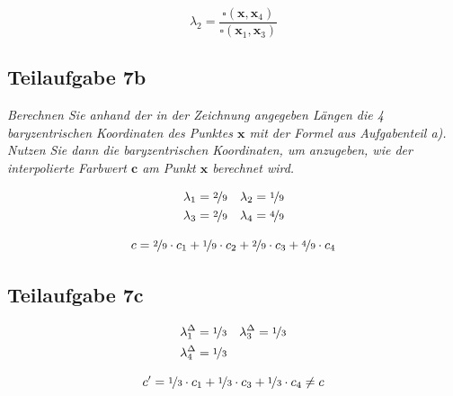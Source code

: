\documentclass[a4paper]{scrartcl}
\begin{document}
\[\lambda_2 = \frac{\square(\mathbf{x}, \mathbf{x}_4)}{\square(\mathbf{x}_1, \mathbf{x}_3)}\]

\subsection*{Teilaufgabe 7b}
\textit{Berechnen Sie anhand der in der Zeichnung angegeben Längen die 4 baryzentrischen
Koordinaten des Punktes $\mathbf{x}$ mit der Formel aus Aufgabenteil a). Nutzen Sie dann
die baryzentrischen Koordinaten, um anzugeben, wie der interpolierte Farbwert $\mathbf{c}$ am
Punkt $\mathbf{x}$ berechnet wird.}

\begin{align}
    \lambda_1 &= \nicefrac{2}{9}  & \lambda_2 &= \nicefrac{1}{9}\\
    \lambda_3 &= \nicefrac{2}{9}  & \lambda_4 &= \nicefrac{4}{9}
\end{align}

\[c = \nicefrac{2}{9} \cdot c_1 + \nicefrac{1}{9} \cdot c_2 + \nicefrac{2}{9} \cdot c_3 + \nicefrac{4}{9} \cdot c_4\]

\subsection*{Teilaufgabe 7c}
\begin{align}
    \lambda_1^\Delta &= \nicefrac{1}{3}  & \lambda_3^\Delta &= \nicefrac{1}{3}\\
    \lambda_4^\Delta &= \nicefrac{1}{3}
\end{align}

\[c' = \nicefrac{1}{3} \cdot c_1 + \nicefrac{1}{3} \cdot c_3 + \nicefrac{1}{3} \cdot c_4 \neq c\]
\end{document}
